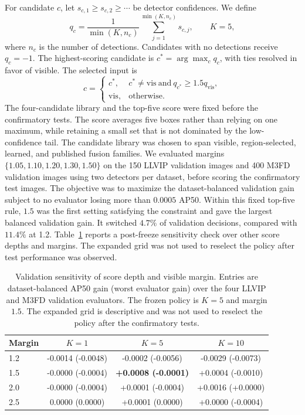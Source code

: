 \documentclass[preprint,11pt]{elsarticle}
\begin{document}
For candidate \(c\), let
\(s_{c,1}\ge s_{c,2}\ge\cdots\) be detector confidences. We define
\begin{equation}
q_c=\frac{1}{\min(K,n_c)}
\sum_{j=1}^{\min(K,n_c)}s_{c,j},
\qquad K=5,
\end{equation}
where \(n_c\) is the number of detections. Candidates with no detections receive
\(q_c=-1\). The highest-scoring candidate is
\(c^\ast=\arg\max_c q_c\), with ties resolved in favor of visible. The selected
input is
\begin{equation}
c=
\begin{cases}
c^\ast, & c^\ast\ne\mathrm{vis}\ \text{and}\ q_{c^\ast}\ge1.5q_{\mathrm{vis}},\\
\mathrm{vis}, & \text{otherwise}.
\end{cases}
\end{equation}
The four-candidate library and the top-five score were fixed before the
confirmatory tests. The score averages five boxes rather than relying on one
maximum, while retaining a small set that is not dominated by the low-confidence
tail. The candidate library was chosen to span visible, region-selected,
learned, and published fusion families. We evaluated margins
\(\{1.05,1.10,1.20,1.30,1.50\}\) on the 150 LLVIP validation images and 400
M3FD validation images using two detectors per dataset, before scoring the
confirmatory test images. The objective was to maximize the dataset-balanced
validation gain subject to no evaluator losing more than \(0.0005\) AP50.
Within this fixed top-five rule, \(1.5\) was the first setting satisfying the
constraint and gave the largest balanced validation gain. It switched
\(4.7\%\) of validation decisions, compared with \(11.4\%\) at 1.2.
Table~\ref{tab:score-margin} reports a post-freeze sensitivity check over other
score depths and margins. The expanded grid was not used to reselect the policy
after test performance was observed.

\begin{table}[t]
\centering
\small
\caption{Validation sensitivity of score depth and visible margin. Entries are
dataset-balanced AP50 gain (worst evaluator gain) over the four LLVIP and M3FD
validation evaluators. The frozen policy is \(K=5\) and margin \(1.5\). The
expanded grid is descriptive and was not used to reselect the policy after the
confirmatory tests.}
\label{tab:score-margin}
\begin{tabular}{@{}lccc@{}}
\toprule
Margin & \(K=1\) & \(K=5\) & \(K=10\) \\
\midrule
1.2 & -0.0014 (-0.0048) & -0.0002 (-0.0056) & -0.0029 (-0.0073) \\
1.5 & -0.0000 (-0.0004) & \textbf{+0.0008 (-0.0001)} &
+0.0004 (-0.0010) \\
2.0 & -0.0000 (-0.0004) & +0.0001 (-0.0004) & +0.0016 (+0.0000) \\
2.5 & 0.0000 (0.0000) & +0.0001 (0.0000) & +0.0000 (-0.0004) \\
\bottomrule
\end{tabular}
\end{table}
\end{document}
